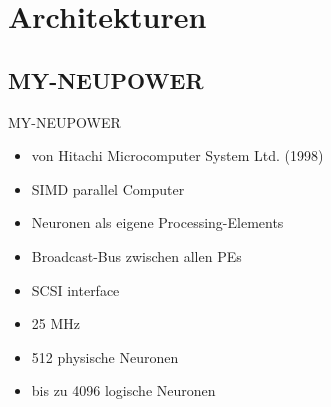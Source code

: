 \section{Architekturen}


\subsection{MY-NEUPOWER}
\begin{slide}{MY-NEUPOWER}
	\begin{itemize}
		\item von Hitachi Microcomputer System Ltd. (1998)
		\item SIMD parallel Computer
		\item Neuronen als eigene Processing-Elements
		\item Broadcast-Bus zwischen allen PEs
		\item SCSI interface
		\item 25 MHz
		\item 512 physische Neuronen
		\item bis zu 4096 logische Neuronen
	\end{itemize}
\end{slide}

